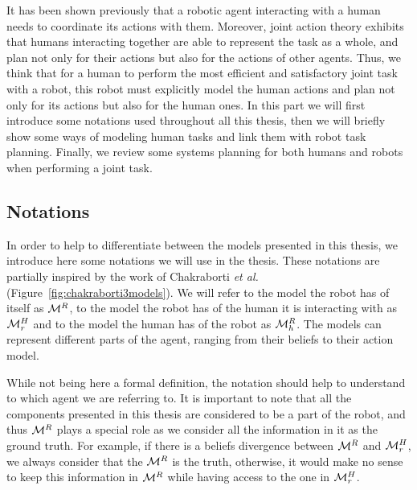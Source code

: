 \documentclass[a4paper,11pt,twoside]{StyleThese}
\begin{document}
It has been shown previously that a robotic agent interacting with a human needs to coordinate its actions with them. Moreover, joint action theory exhibits that humans interacting together are able to represent the task as a whole, and plan not only for their actions but also for the actions of other agents. Thus, we think that for a human to perform the most efficient and satisfactory joint task with a robot, this robot must explicitly model the human actions and plan not only for its actions but also for the human ones. In this part we will first introduce some notations used throughout all this thesis, then we will briefly show some ways of modeling human tasks and link them with robot task planning. Finally, we review some systems planning for both humans and robots when performing a joint task.

\subsection{Notations}
In order to help to differentiate between the models presented in this thesis, we introduce here some notations we will use in the thesis. These notations are partially inspired by the work of Chakraborti \textit{et al.} \cite{chakraborti2018human} (Figure~\ref{fig:chakraborti3models}). We will refer to the model the robot has of itself as $\mathcal{M}^R$, to the model the robot has of the human it is interacting with as $\mathcal{M}^H_r$ and to the model the human has of the robot as $\mathcal{M}^R_h$. The models can represent different parts of the agent, ranging from their beliefs to their action model. 

While not being here a formal definition, the notation should help to understand to which agent we are referring to. It is important to note that all the components presented in this thesis are considered to be a part of the robot, and thus $\mathcal{M}^R$ plays a special role as we consider all the information in it as the ground truth. For example, if there is a beliefs divergence between $\mathcal{M}^R$ and $\mathcal{M}^H_r$, we always consider that the $\mathcal{M}^R$ is the truth, otherwise, it would make no sense to keep this information in $\mathcal{M}^R$ while having access to the one in $\mathcal{M}^H_r$.
\end{document}
